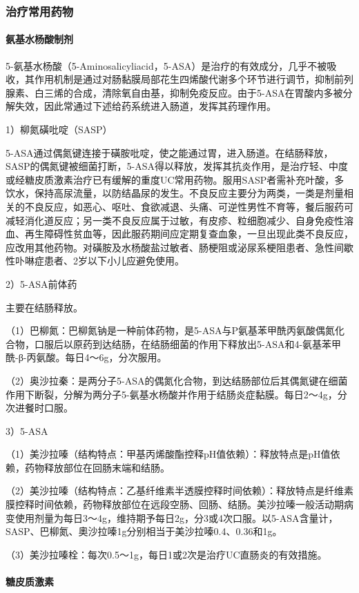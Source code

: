\subsubsection{治疗常用药物}
\paragraph{氨基水杨酸制剂}

5-氨基水杨酸（5-Aminosalicyliacid，5-ASA）是治疗的有效成分，几乎不被吸收，其作用机制是通过对肠黏膜局部花生四烯酸代谢多个环节进行调节，抑制前列腺素、白三烯的合成，清除氧自由基，抑制免疫反应。由于5-ASA在胃酸内多被分解失效，因此常通过下述给药系统进入肠道，发挥其药理作用。

1）柳氮磺吡啶（SASP）

5-ASA通过偶氮键连接于磺胺吡啶，使之能通过胃，进入肠道。在结肠释放，SASP的偶氮键被细菌打断，5-ASA得以释放，发挥其抗炎作用，是治疗轻、中度或经糖皮质激素治疗已有缓解的重度UC常用药物。服用SASP者需补充叶酸，多饮水，保持高尿流量，以防结晶尿的发生。不良反应主要分为两类，一类是剂量相关的不良反应，如恶心、呕吐、食欲减退、头痛、可逆性男性不育等，餐后服药可减轻消化道反应；另一类不良反应属于过敏，有皮疹、粒细胞减少、自身免疫性溶血、再生障碍性贫血等，因此服药期间应定期复查血象，一旦出现此类不良反应，应改用其他药物。对磺胺及水杨酸盐过敏者、肠梗阻或泌尿系梗阻患者、急性间歇性卟啉症患者、2岁以下小儿应避免使用。

2）5-ASA前体药

主要在结肠释放。

（1）巴柳氮：巴柳氮钠是一种前体药物，是5-ASA与P氨基苯甲酰丙氨酸偶氮化合物，口服后以原药到达结肠，在结肠细菌的作用下释放出5-ASA和4-氨基苯甲酰-β-丙氨酸。每日4～6g，分次服用。

（2）奥沙拉秦：是两分子5-ASA的偶氮化合物，到达结肠部位后其偶氮键在细菌作用下断裂，分解为两分子5-氨基水杨酸并作用于结肠炎症黏膜。每日2～4g，分次进餐时口服。

3）5-ASA

（1）美沙拉嗪（结构特点：甲基丙烯酸酯控释pH值依赖）：释放特点是pH值依赖，药物释放部位在回肠末端和结肠。

（2）美沙拉嗪（结构特点：乙基纤维素半透膜控释时间依赖）：释放特点是纤维素膜控释时间依赖，药物释放部位在远段空肠、回肠、结肠。美沙拉嗪一般活动期病变使用剂量为每日3～4g，维持期予每日2g，分3或4次口服。以5-ASA含量计，SASP、巴柳氮、奧沙拉嗪1g分别相当于美沙拉嗪0.4、0.36和1g。

（3）美沙拉嗪栓：每次0.5～1g，每日1或2次是治疗UC直肠炎的有效措施。
\paragraph{糖皮质激素}

